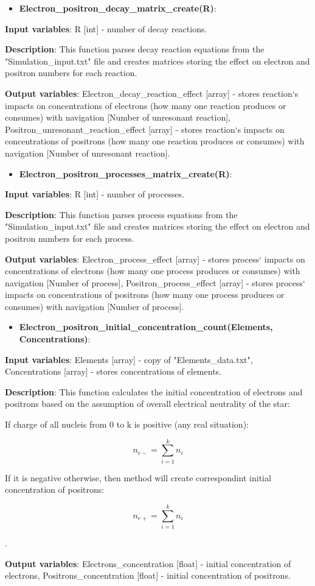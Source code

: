 \documentclass[a4paper,12pt]{article}
\newcommand{\namefunction}[4]{
  \begin{itemize}
    \item \textbf{#1}:
  \end{itemize}
  
  \textbf{Input variables}: #2.
  
  \textbf{Description}: #3.
  
  \textbf{Output variables}: #4.
}
\begin{document}
\namefunction{Electron\_positron\_decay\_matrix\_create(R)}{R [int] - number of decay reactions}{This function parses decay reaction equations from the "Simulation\_input.txt" file and creates matrices storing the effect on electron and positron numbers for each reaction}{Electron\_decay\_reaction\_effect [array] - stores reaction`s  impacts on concentrations of electrons (how many one reaction produces or consumes) with navigation [Number of unresonant reaction], Positron\_unresonant\_reaction\_effect [array] - stores reaction`s impacts on concentrations of positrons (how many one reaction produces or consumes) with navigation [Number of unresonant reaction]}

\vspace{1em}

\namefunction{Electron\_positron\_processes\_matrix\_create(R)}{R [int] - number of processes}{This function parses process equations from the "Simulation\_input.txt" file and creates matrices storing the effect on electron and positron numbers for each process}{Electron\_process\_effect [array] - stores process` impacts on concentrations of electrons (how many one process produces or consumes) with navigation [Number of process], Positron\_process\_effect [array] - stores process` impacts on concentrations of positrons (how many one process produces or consumes) with navigation [Number of process]}

\vspace{1em}

\namefunction{Electron\_positron\_initial\_concentration\_count(Elements, Concentrations)}{Elements [array] - copy of "Elements\_data.txt", Concentrations [array] - stores concentrations of elements}{This function calculates the initial concentration of electrons and positrons based on the assumption of overall electrical neutrality of the star:

If charge of all nucleis from 0 to k is positive (any real situation):

\[n_{e-} = \sum_{i = 1}^{k} n_{i}\]

If it is negative otherwise, then method will create correspondint initial concentration of positrons:

\[n_{e+} = \sum_{i = 1}^{k} n_{i}\]

}{Electrons\_concentration [float] - initial concentration of electrons, Positrons\_concentration [float] - initial concentration of positrons}

\vspace{1em}
\end{document}
